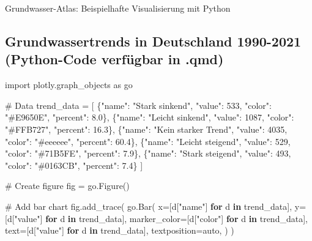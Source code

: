 \documentclass[
  letterpaper,
  DIV=11]{scrartcl}
\newenvironment{Shaded}{\begin{snugshade}}{\end{snugshade}}
\newcommand{\CommentTok}[1]{\textcolor[rgb]{0.37,0.37,0.37}{#1}}
\newcommand{\ControlFlowTok}[1]{\textcolor[rgb]{0.00,0.23,0.31}{\textbf{#1}}}
\newcommand{\DecValTok}[1]{\textcolor[rgb]{0.68,0.00,0.00}{#1}}
\newcommand{\FloatTok}[1]{\textcolor[rgb]{0.68,0.00,0.00}{#1}}
\newcommand{\ImportTok}[1]{\textcolor[rgb]{0.00,0.46,0.62}{#1}}
\newcommand{\KeywordTok}[1]{\textcolor[rgb]{0.00,0.23,0.31}{\textbf{#1}}}
\newcommand{\NormalTok}[1]{\textcolor[rgb]{0.00,0.23,0.31}{#1}}
\newcommand{\OperatorTok}[1]{\textcolor[rgb]{0.37,0.37,0.37}{#1}}
\newcommand{\StringTok}[1]{\textcolor[rgb]{0.13,0.47,0.30}{#1}}
\begin{document}
Grundwasser-Atlas: Beispielhafte Visualisierung mit Python

\subsection{Grundwassertrends in Deutschland 1990-2021 (Python-Code
verfügbar in
.qmd)}\label{grundwassertrends-in-deutschland-1990-2021-python-code-verfuxfcgbar-in-.qmd}

\begin{Shaded}
\begin{Highlighting}[]
\ImportTok{import}\NormalTok{ plotly.graph\_objects }\ImportTok{as}\NormalTok{ go}

\CommentTok{\# Data}
\NormalTok{trend\_data }\OperatorTok{=}\NormalTok{ [}
\NormalTok{    \{}\StringTok{"name"}\NormalTok{: }\StringTok{"Stark sinkend"}\NormalTok{, }\StringTok{"value"}\NormalTok{: }\DecValTok{533}\NormalTok{, }\StringTok{"color"}\NormalTok{: }\StringTok{"\#E9650E"}\NormalTok{, }\StringTok{"percent"}\NormalTok{: }\FloatTok{8.0}\NormalTok{\},}
\NormalTok{    \{}\StringTok{"name"}\NormalTok{: }\StringTok{"Leicht sinkend"}\NormalTok{, }\StringTok{"value"}\NormalTok{: }\DecValTok{1087}\NormalTok{, }\StringTok{"color"}\NormalTok{: }\StringTok{"\#FFB727"}\NormalTok{, }\StringTok{"percent"}\NormalTok{: }\FloatTok{16.3}\NormalTok{\},}
\NormalTok{    \{}\StringTok{"name"}\NormalTok{: }\StringTok{"Kein starker Trend"}\NormalTok{, }\StringTok{"value"}\NormalTok{: }\DecValTok{4035}\NormalTok{, }\StringTok{"color"}\NormalTok{: }\StringTok{"\#eeeeee"}\NormalTok{, }\StringTok{"percent"}\NormalTok{: }\FloatTok{60.4}\NormalTok{\},}
\NormalTok{    \{}\StringTok{"name"}\NormalTok{: }\StringTok{"Leicht steigend"}\NormalTok{, }\StringTok{"value"}\NormalTok{: }\DecValTok{529}\NormalTok{, }\StringTok{"color"}\NormalTok{: }\StringTok{"\#71B5FE"}\NormalTok{, }\StringTok{"percent"}\NormalTok{: }\FloatTok{7.9}\NormalTok{\},}
\NormalTok{    \{}\StringTok{"name"}\NormalTok{: }\StringTok{"Stark steigend"}\NormalTok{, }\StringTok{"value"}\NormalTok{: }\DecValTok{493}\NormalTok{, }\StringTok{"color"}\NormalTok{: }\StringTok{"\#0163CB"}\NormalTok{, }\StringTok{"percent"}\NormalTok{: }\FloatTok{7.4}\NormalTok{\}}
\NormalTok{]}

\CommentTok{\# Create figure}
\NormalTok{fig }\OperatorTok{=}\NormalTok{ go.Figure()}

\CommentTok{\# Add bar chart}
\NormalTok{fig.add\_trace(}
\NormalTok{    go.Bar(}
\NormalTok{        x}\OperatorTok{=}\NormalTok{[d[}\StringTok{"name"}\NormalTok{] }\ControlFlowTok{for}\NormalTok{ d }\KeywordTok{in}\NormalTok{ trend\_data],}
\NormalTok{        y}\OperatorTok{=}\NormalTok{[d[}\StringTok{"value"}\NormalTok{] }\ControlFlowTok{for}\NormalTok{ d }\KeywordTok{in}\NormalTok{ trend\_data],}
\NormalTok{        marker\_color}\OperatorTok{=}\NormalTok{[d[}\StringTok{"color"}\NormalTok{] }\ControlFlowTok{for}\NormalTok{ d }\KeywordTok{in}\NormalTok{ trend\_data],}
\NormalTok{        text}\OperatorTok{=}\NormalTok{[d[}\StringTok{"value"}\NormalTok{] }\ControlFlowTok{for}\NormalTok{ d }\KeywordTok{in}\NormalTok{ trend\_data],}
\NormalTok{        textposition}\OperatorTok{=}\StringTok{\textquotesingle{}auto\textquotesingle{}}\NormalTok{,}
\NormalTok{    )}
\NormalTok{)}


\end{Highlighting}
\end{Shaded}
\end{document}
